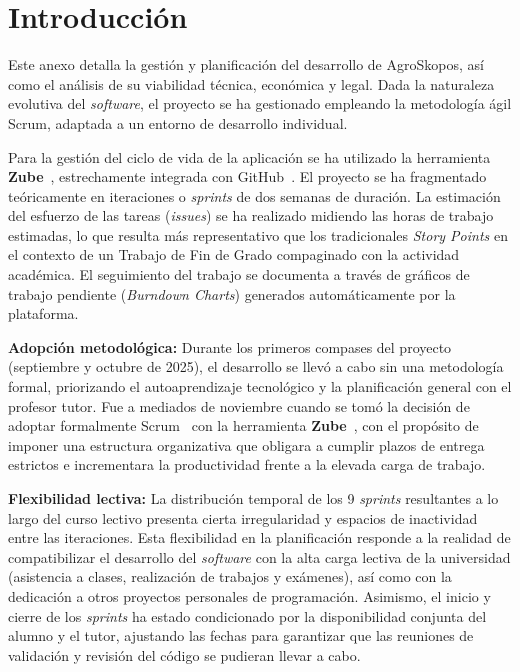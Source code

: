 
\section{Introducción}
Este anexo detalla la gestión y planificación del desarrollo de AgroSkopos, así como el análisis de su viabilidad técnica, económica y legal. Dada la naturaleza evolutiva del \textit{software}, el proyecto se ha gestionado empleando la metodología ágil Scrum, adaptada a un entorno de desarrollo individual.

Para la gestión del ciclo de vida de la aplicación se ha utilizado la herramienta \textbf{Zube}~\cite{zube}, estrechamente integrada con GitHub~\cite{github}. El proyecto se ha fragmentado teóricamente en iteraciones o \textit{sprints} de dos semanas de duración. La estimación del esfuerzo de las tareas (\textit{issues}) se ha realizado midiendo las horas de trabajo estimadas, lo que resulta más representativo que los tradicionales \textit{Story Points} en el contexto de un Trabajo de Fin de Grado compaginado con la actividad académica. El seguimiento del trabajo se documenta a través de gráficos de trabajo pendiente (\textit{Burndown Charts}) generados automáticamente por la plataforma.

\textbf{Adopción metodológica:} Durante los primeros compases del proyecto (septiembre y octubre de 2025), el desarrollo se llevó a cabo sin una metodología formal, priorizando el autoaprendizaje tecnológico y la planificación general con el profesor tutor. Fue a mediados de noviembre cuando se tomó la decisión de adoptar formalmente Scrum~\cite{scrum} con la herramienta \textbf{Zube}~\cite{zube}, con el propósito de imponer una estructura organizativa que obligara a cumplir plazos de entrega estrictos e incrementara la productividad frente a la elevada carga de trabajo.

\textbf{Flexibilidad lectiva:} La distribución temporal de los 9 \textit{sprints} resultantes a lo largo del curso lectivo presenta cierta irregularidad y espacios de inactividad entre las iteraciones. Esta flexibilidad en la planificación responde a la realidad de compatibilizar el desarrollo del \textit{software} con la alta carga lectiva de la universidad (asistencia a clases, realización de trabajos y exámenes), así como con la dedicación a otros proyectos personales de programación. Asimismo, el inicio y cierre de los \textit{sprints} ha estado condicionado por la disponibilidad conjunta del alumno y el tutor, ajustando las fechas para garantizar que las reuniones de validación y revisión del código se pudieran llevar a cabo.

